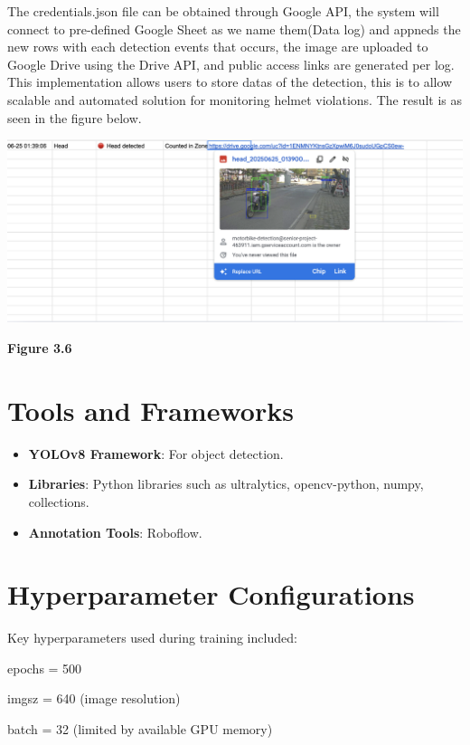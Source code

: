 \noindent\hspace{2.5em}The credentials.json file can be obtained through Google API, the system will connect to pre-defined Google Sheet as we name them(Data log) and appneds the new rows with each detection events that occurs, the image are uploaded to Google Drive using the Drive API, and public access links are generated per log. This implementation allows users to store datas of the detection, this is to allow scalable and automated solution for monitoring helmet violations. The result is as seen in the figure below.

\begin{center}
	\includegraphics[width=1\textwidth]{api.png}
	
	\vspace{0.5em}
	\textbf{Figure 3.6}
\end{center}

\section{Tools and Frameworks}
\begin{itemize}
	\item \textbf{YOLOv8 Framework}: For object detection.
	\item \textbf{Libraries}: Python libraries such as ultralytics, opencv-python, numpy, collections.
	\item \textbf{Annotation Tools}: Roboflow.
	
\end{itemize}


\section{Hyperparameter Configurations}
Key hyperparameters used during training included:

epochs = 500

imgsz = 640 (image resolution)

batch = 32 (limited by available GPU memory)

